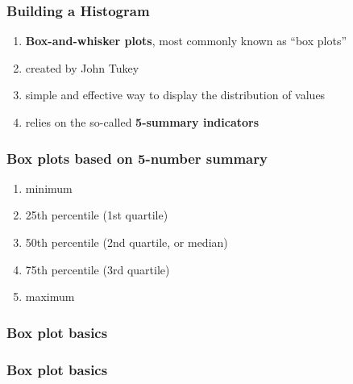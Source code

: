 \documentclass[12pt]{beamer}\usepackage[]{graphicx}\usepackage[]{color}
\begin{document}

\begin{frame}
\frametitle{Building a Histogram}

\begin{enumerate}
  \item \textbf{Box-and-whisker plots}, most commonly known as ``box plots''
  \item created by John Tukey
  \item simple and effective way to display the distribution of values
  \item relies on the so-called \textbf{5-summary indicators}
\end{enumerate}

\end{frame}


\begin{frame}
\frametitle{Box plots based on 5-number summary}

\pause
\begin{enumerate}
  \item minimum
  \item 25th percentile (1st quartile)
  \item 50th percentile (2nd quartile, or median)
  \item 75th percentile (3rd quartile)
  \item maximum
\end{enumerate}
\eb

\end{frame}


\begin{frame}
\frametitle{Box plot basics}
\begin{center}
\end{center}
\end{frame}


\begin{frame}
\frametitle{Box plot basics}
\begin{center}
\end{center}
\end{frame}

\end{document}
